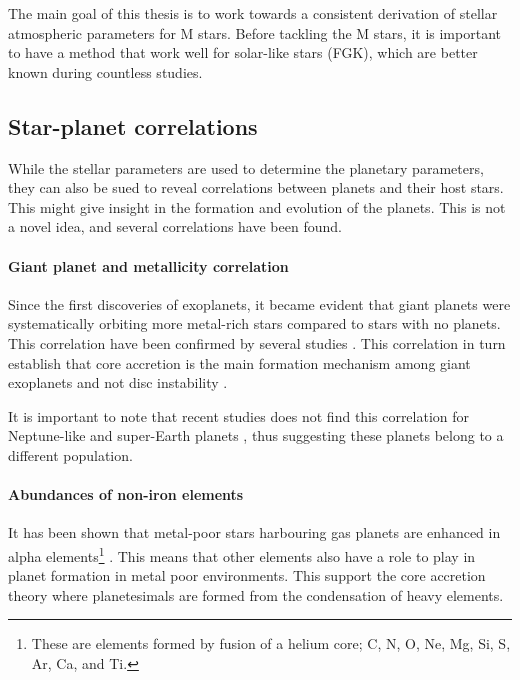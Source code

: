 The main goal of this thesis is to work towards a consistent derivation of stellar atmospheric
parameters for M stars. Before tackling the M stars, it is important to have a method that work well
for solar-like stars (FGK), which are better known during countless studies.

\subsection{Star-planet correlations}

While the stellar parameters are used to determine the planetary parameters, they can also be sued
to reveal correlations between planets and their host stars. This might give insight in the
formation and evolution of the planets. This is not a novel idea, and several correlations have been
found.

\paragraph{Giant planet and metallicity correlation}

Since the first discoveries of exoplanets, it became evident that giant planets were systematically
orbiting more metal-rich stars compared to stars with no planets. This correlation have been
confirmed by several studies \citep{Gonzalez1997,Santos2004,Fischer2005,Sousa2008a,Mortier2013b}.
This correlation in turn establish that core accretion is the main formation mechanism among giant
exoplanets \citep{Pollack1996,Ida2004,Mordasini2012} and not disc instability \citep{Boss2002}.

It is important to note that recent studies does not find this correlation for Neptune-like and
super-Earth planets \citep{Sousa2011,Buchhave2012}, thus suggesting these planets belong to a
different population.

\paragraph{Abundances of non-iron elements}

It has been shown that metal-poor stars harbouring gas planets are enhanced in alpha
elements\footnote{These are elements formed by fusion of a helium core; C, N, O, Ne, Mg, Si, S, Ar,
Ca, and Ti.} \citep[see e.g.]{Adibekyan2012a}. This means that other elements also have a role to
play in planet formation in metal poor environments. This support the core accretion theory where
planetesimals are formed from the condensation of heavy elements.


